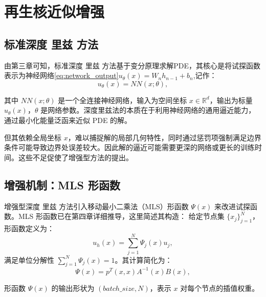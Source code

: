 \documentclass[engineeringmaster]{hquThesis}
\begin{document}
\section{再生核近似增强}

\subsection{标准深度 里兹 方法}
由第三章可知，标准深度 里兹 方法基于变分原理求解PDE，其核心是将试探函数表示为神经网络\eqref{eq:network_output}\(u_{\theta}(x) = W_n h_{n-1} + b_n\),记作：
\begin{equation}
u_\theta(x) = NN(x; \theta),
\end{equation}

其中 \(NN(x; \theta)\) 是一个全连接神经网络，输入为空间坐标 \(x \in \mathbb{R}^d\)，输出为标量 \(u_\theta(x)\)，\(\theta\) 是网络参数。深度里兹法的本质在于利用神经网络的通用逼近能力，通过最小化能量泛函来近似 PDE 的解。

但其依赖全局坐标 \(x\)，难以捕捉解的局部几何特性，同时通过惩罚项强制满足边界条件可能导致边界处误差较大。因此解的逼近可能需要更深的网络或更长的训练时间。这些不足促使了增强型方法的提出。


\subsection{增强机制：MLS 形函数}
增强型深度 里兹 方法引入移动最小二乘法（MLS）形函数 \(\Psi(x)\) 来改进试探函数。MLS 形函数已在第四章详细推导，这里简述其构造：
给定节点集 \(\{x_j\}_{j=1}^N\)，形函数定义为：
\begin{equation}
u_h(x) = \sum_{j=1}^N \Psi_j(x) u_j,
\end{equation}
满足单位分解性 \(\sum_{j=1}^N \Psi_j(x) = 1\)。其计算简化为：
\begin{equation}
\Psi(x) = p^T(x, x) A^{-1}(x) B(x),
\end{equation}

形函数 \(\Psi(x)\) 的输出形状为 \((batch\_size, N)\)，表示 \(x\) 对每个节点的插值权重。

\end{document}
